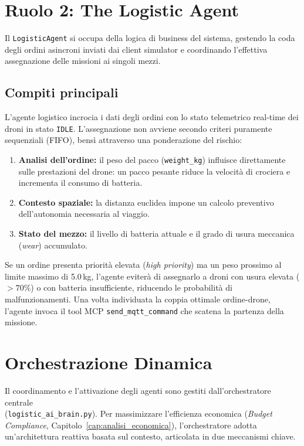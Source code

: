 \section{Ruolo 2: The Logistic Agent}
\label{sec:logistic_agent}

Il \texttt{LogisticAgent} si occupa della logica di business del sistema, gestendo la coda degli ordini asincroni inviati dai client simulator e coordinando l'effettiva assegnazione delle missioni ai singoli mezzi.

\subsection*{Compiti principali}

L'agente logistico incrocia i dati degli ordini con lo stato telemetrico real-time dei droni in stato \texttt{IDLE}. L'assegnazione non avviene secondo criteri puramente sequenziali (FIFO), bensì attraverso una ponderazione del rischio:

\begin{enumerate}
    \item \textbf{Analisi dell'ordine:} il peso del pacco (\texttt{weight\_kg}) influisce direttamente sulle prestazioni del drone: un pacco pesante riduce la velocità di crociera e incrementa il consumo di batteria.
    \item \textbf{Contesto spaziale:} la distanza euclidea impone un calcolo preventivo dell'autonomia necessaria al viaggio.
    \item \textbf{Stato del mezzo:} il livello di batteria attuale e il grado di usura meccanica (\textit{wear}) accumulato.
\end{enumerate}

Se un ordine presenta priorità elevata (\textit{high priority}) ma un peso prossimo al limite massimo di 5.0\,kg, l'agente eviterà di assegnarlo a droni con usura elevata ($>70\%$) o con batteria insufficiente, riducendo le probabilità di malfunzionamenti. Una volta individuata la coppia ottimale ordine-drone, l'agente invoca il tool MCP \texttt{send\_mqtt\_command} che scatena la partenza della missione.

\section{Orchestrazione Dinamica}
\label{sec:logistic_ai_brain}

Il coordinamento e l'attivazione degli agenti sono gestiti dall'orchestratore centrale \\(\texttt{logistic\_ai\_brain.py}). Per massimizzare l'efficienza economica (\textit{Budget Compliance}, Capitolo~\ref{cap:analisi_economica}), l'orchestratore adotta un'architettura reattiva basata sul contesto, articolata in due meccanismi chiave.

